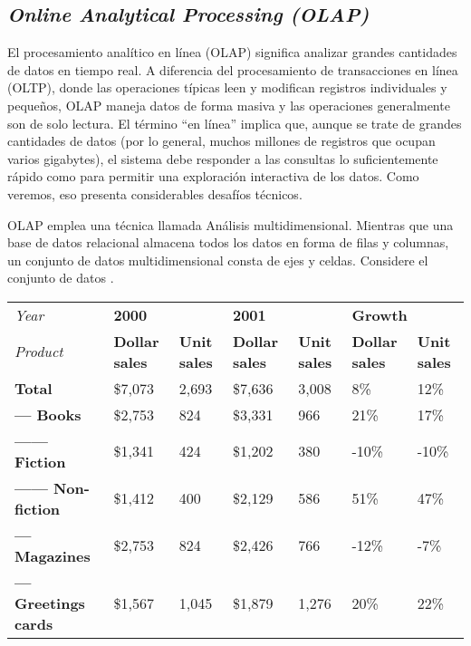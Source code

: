 \begin{spacing}{1.5}
	\subsection{\textit{Online Analytical Processing (OLAP)}}
		El procesamiento analítico en línea (OLAP) significa analizar grandes cantidades de datos en tiempo real. A diferencia del procesamiento de transacciones en línea (OLTP), donde las operaciones típicas leen y modifican registros individuales y pequeños, OLAP maneja datos de forma masiva y las operaciones generalmente son de solo lectura. El término ``en línea'' implica que, aunque se trate de grandes cantidades de datos (por lo general, muchos millones de registros que ocupan varios gigabytes), el sistema debe responder a las consultas lo suficientemente rápido como para permitir una exploración interactiva de los datos. Como veremos, eso presenta considerables desafíos técnicos.
		
		OLAP emplea una técnica llamada Análisis multidimensional. Mientras que una base de datos relacional almacena todos los datos en forma de filas y columnas, un conjunto de datos multidimensional consta de ejes y celdas. Considere el conjunto de datos \cite{chap2_mondrian_pentaho2}.
		
		\begin{table}[h!]
			\begin{tabular}{lllllll}
				\textit{Year}              & \multicolumn{2}{l}{\textbf{2000}}           & \multicolumn{2}{l}{\textbf{2001}}           & \multicolumn{2}{l}{\textbf{Growth}}         \\
				\textit{Product}           & \textbf{Dollar sales} & \textbf{Unit sales} & \textbf{Dollar sales} & \textbf{Unit sales} & \textbf{Dollar sales} & \textbf{Unit sales} \\
				\textbf{Total}             & \$7,073                & 2,693               & \$7,636                & 3,008               & 8\%                    & 12\%                 \\
				\textbf{— Books}           & \$2,753                & 824                 & \$3,331                & 966                 & 21\%                   & 17\%                 \\
				\textbf{—— Fiction}        & \$1,341                & 424                 & \$1,202                & 380                 & -10\%                  & -10\%                \\
				\textbf{—— Non-fiction}    & \$1,412                & 400                 & \$2,129                & 586                 & 51\%                   & 47\%                 \\
				\textbf{— Magazines}       & \$2,753                & 824                 & \$2,426                & 766                 & -12\%                  & -7\%                 \\
				\textbf{— Greetings cards} & \$1,567                & 1,045               & \$1,879                & 1,276               & 20\%                   & 22\%                
			\end{tabular}
		\end{table}
	

\end{spacing}
